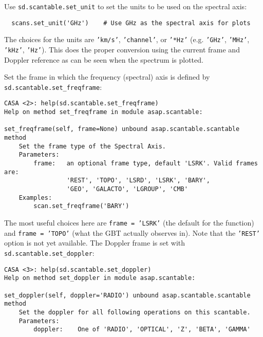Use {\tt sd.scantable.set\_unit} to set the units to be used on 
the spectral axis:
\small
\begin{verbatim}
  scans.set_unit('GHz')    # Use GHz as the spectral axis for plots
\end{verbatim}
\normalsize
The choices for the units are {\tt 'km/s'}, {\tt 'channel'}, or
{\tt '*Hz'} (e.g. {\tt 'GHz'}, {\tt 'MHz'}, {\tt 'kHz'}, {\tt 'Hz'}).
This does the proper conversion using the current frame and Doppler
reference as can be seen when the spectrum is plotted.

Set the frame in which the frequency (spectral) axis is defined by {\tt sd.scantable.set\_freqframe}:
\small
\begin{verbatim}
CASA <2>: help(sd.scantable.set_freqframe)
Help on method set_freqframe in module asap.scantable:

set_freqframe(self, frame=None) unbound asap.scantable.scantable method
    Set the frame type of the Spectral Axis.
    Parameters:
        frame:   an optional frame type, default 'LSRK'. Valid frames are:
                 'REST', 'TOPO', 'LSRD', 'LSRK', 'BARY',
                 'GEO', 'GALACTO', 'LGROUP', 'CMB'
    Examples:
        scan.set_freqframe('BARY')
\end{verbatim}
\normalsize
The most useful choices here are {\tt frame = 'LSRK'} (the default for
the function) and {\tt frame = 'TOPO'} (what the GBT actually observes
in).  Note that the {\tt 'REST'} option is not yet available.
The Doppler frame is set with {\tt sd.scantable.set\_doppler}:
\small
\begin{verbatim}
CASA <3>: help(sd.scantable.set_doppler)
Help on method set_doppler in module asap.scantable:

set_doppler(self, doppler='RADIO') unbound asap.scantable.scantable method
    Set the doppler for all following operations on this scantable.
    Parameters:
        doppler:    One of 'RADIO', 'OPTICAL', 'Z', 'BETA', 'GAMMA'
\end{verbatim}
\normalsize

